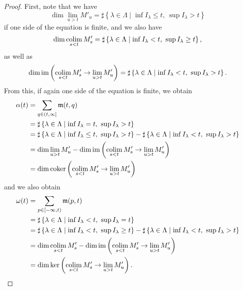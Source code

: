 \begin{proof}
	First, note that we have 
	\[
	    \dim \lim_{u > t} M'_{u} 
	    = \sharp \left\{ \lambda \in \Lambda \mid \inf I_{\lambda} \leq t,\ \sup I_{\lambda} > t \right\} 
	\]
	if one side of the equation is finite, and we also have
	\[
	    \dim \operatorname*{colim}_{s < t} M'_{s} 
	    = \sharp \left\{ \lambda \in \Lambda \mid \inf I_{\lambda} < t,\ \sup I_{\lambda} \geq t \right\}, 
	\]
	as well as
	\[
	    \dim \operatorname{im} \left( \operatorname*{colim}_{s < t} M'_{s} \to \lim_{u > t} M'_{u} \right)
	    = \sharp \left\{ \lambda \in \Lambda \mid \inf I_{\lambda} < t,\ \sup I_{\lambda} > t \right\}.
	\]
	From this, if again one side of the equation is finite, we obtain
	\begin{align*}
	    \alpha(t) &= \sum_{q \in (t, \infty]} \mathfrak{m}(t,q) \\
	              &= \sharp \left\{ \lambda \in \Lambda \mid \inf I_{\lambda} = t,\ \sup I_{\lambda} > t \right\} \\
	              &= \sharp \left\{ \lambda \in \Lambda \mid \inf I_{\lambda} \leq t,\ \sup I_{\lambda} > t \right\}
	              -  \sharp \left\{ \lambda \in \Lambda \mid \inf I_{\lambda} < t,\ \sup I_{\lambda} > t \right\} \\
	              &= \dim \lim_{u > t} M'_{u} - \dim \operatorname{im} \left( \operatorname*{colim}_{s < t} M'_{s} \to \lim_{u > t} M'_{u} \right) \\
	              &= \dim \operatorname{coker} \left( \operatorname*{colim}_{s < t} M'_{s} \to \lim_{u > t} M'_{u} \right)
	\end{align*}
	and we also obtain
	\begin{align*}
	    \omega(t) &= \sum_{p \in [-\infty, t)} \mathfrak{m}(p,t) \\
	              &= \sharp \left\{ \lambda \in \Lambda \mid \inf I_{\lambda} < t,\ \sup I_{\lambda} = t \right\} \\
	              &= \sharp \left\{ \lambda \in \Lambda \mid \inf I_{\lambda} < t,\ \sup I_{\lambda} \geq t \right\}
	              -  \sharp \left\{ \lambda \in \Lambda \mid \inf I_{\lambda} < t,\ \sup I_{\lambda} > t \right\} \\
	              &= \dim \operatorname*{colim}_{s < t} M'_{s} - \dim \operatorname{im} \left( \operatorname*{colim}_{s < t} M'_{s} \to \lim_{u > t} M'_{u} \right) \\
	              &= \dim \ker \left( \operatorname*{colim}_{s < t} M'_{s} \to \lim_{u > t} M'_{u} \right).
	              \qedhere
	\end{align*}
\end{proof}

